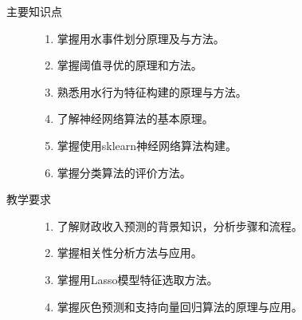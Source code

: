 \documentclass[12pt,a4paper,openany,cap]{ctexbook}
\begin{document}
\begin{description}
\item[主要知识点]
  \begin{minipage}[t]{0.8\linewidth}
    \begin{enumerate}
    \item 掌握用水事件划分原理及与方法。
\item\label{item:238}  掌握阈值寻优的原理和方法。
\item\label{item:239}  熟悉用水行为特征构建的原理与方法。
\item\label{item:240}  了解神经网络算法的基本原理。
\item\label{item:241}  掌握使用sklearn神经网络算法构建。
\item\label{item:242}  掌握分类算法的评价方法。
    \end{enumerate}
  \end{minipage}

\item[教学要求]
  \begin{minipage}[t]{0.8\linewidth}
    \begin{enumerate}
    \item  了解财政收入预测的背景知识，分析步骤和流程。
\item\label{item:243}  掌握相关性分析方法与应用。
\item\label{item:244}  掌握用Lasso模型特征选取方法。
\item\label{item:245}  掌握灰色预测和支持向量回归算法的原理与应用。
    \end{enumerate}
  \end{minipage}


\end{description}
\end{document}
